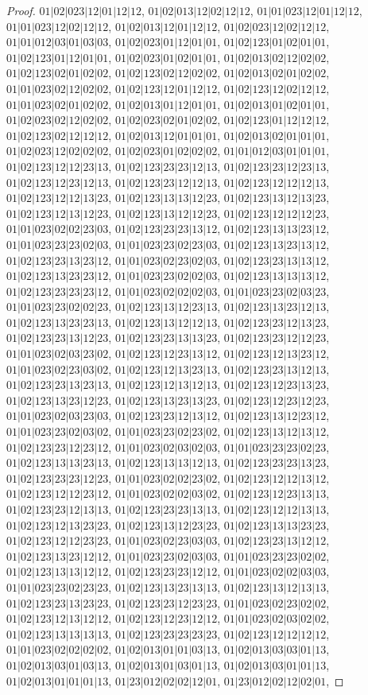\documentclass[12pt]{article}
\theoremstyle{plain}
\theoremstyle{definition}
\theoremstyle{remark}
\begin{document}
\begin{proof}
$01|02|023|12|01|12|12$, $01|02|013|12|02|12|12$, $01|01|023|12|01|12|12$, $01|01|023|12|02|12|12$, $01|02|013|12|01|12|12$, $01|02|023|12|02|12|12$, $01|01|012|03|01|03|03$, $01|02|023|01|12|01|01$, $01|02|123|01|02|01|01$, $01|02|123|01|12|01|01$, $01|02|023|01|02|01|01$, $01|02|013|02|12|02|02$, $01|02|123|02|01|02|02$, $01|02|123|02|12|02|02$, $01|02|013|02|01|02|02$, $01|01|023|02|12|02|02$, $01|02|123|12|01|12|12$, $01|02|123|12|02|12|12$, $01|01|023|02|01|02|02$, $01|02|013|01|12|01|01$, $01|02|013|01|02|01|01$, $01|02|023|02|12|02|02$, $01|02|023|02|01|02|02$, $01|02|123|01|12|12|12$, $01|02|123|02|12|12|12$, $01|02|013|12|01|01|01$, $01|02|013|02|01|01|01$, $01|02|023|12|02|02|02$, $01|02|023|01|02|02|02$, $01|01|012|03|01|01|01$, $01|02|123|12|12|23|13$, $01|02|123|23|23|12|13$, $01|02|123|23|12|23|13$, $01|02|123|12|23|12|13$, $01|02|123|23|12|12|13$, $01|02|123|12|12|12|13$, $01|02|123|12|12|13|23$, $01|02|123|13|13|12|23$, $01|02|123|13|12|13|23$, $01|02|123|12|13|12|23$, $01|02|123|13|12|12|23$, $01|02|123|12|12|12|23$, $01|01|023|02|02|23|03$, $01|02|123|23|23|13|12$, $01|02|123|13|13|23|12$, $01|01|023|23|23|02|03$, $01|01|023|23|02|23|03$, $01|02|123|13|23|13|12$, $01|02|123|23|13|23|12$, $01|01|023|02|23|02|03$, $01|02|123|23|13|13|12$, $01|02|123|13|23|23|12$, $01|01|023|23|02|02|03$, $01|02|123|13|13|13|12$, $01|02|123|23|23|23|12$, $01|01|023|02|02|02|03$, $01|01|023|23|02|03|23$, $01|01|023|23|02|02|23$, $01|02|123|13|12|23|13$, $01|02|123|13|23|12|13$, $01|02|123|13|23|23|13$, $01|02|123|13|12|12|13$, $01|02|123|23|12|13|23$, $01|02|123|23|13|12|23$, $01|02|123|23|13|13|23$, $01|02|123|23|12|12|23$, $01|01|023|02|03|23|02$, $01|02|123|12|23|13|12$, $01|02|123|12|13|23|12$, $01|01|023|02|23|03|02$, $01|02|123|12|13|23|13$, $01|02|123|23|13|12|13$, $01|02|123|23|13|23|13$, $01|02|123|12|13|12|13$, $01|02|123|12|23|13|23$, $01|02|123|13|23|12|23$, $01|02|123|13|23|13|23$, $01|02|123|12|23|12|23$, $01|01|023|02|03|23|03$, $01|02|123|23|12|13|12$, $01|02|123|13|12|23|12$, $01|01|023|23|02|03|02$, $01|01|023|23|02|23|02$, $01|02|123|13|12|13|12$, $01|02|123|23|12|23|12$, $01|01|023|02|03|02|03$, $01|01|023|23|23|02|23$, $01|02|123|13|13|23|13$, $01|02|123|13|13|12|13$, $01|02|123|23|23|13|23$, $01|02|123|23|23|12|23$, $01|01|023|02|02|23|02$, $01|02|123|12|12|13|12$, $01|02|123|12|12|23|12$, $01|01|023|02|02|03|02$, $01|02|123|12|23|13|13$, $01|02|123|23|12|13|13$, $01|02|123|23|23|13|13$, $01|02|123|12|12|13|13$, $01|02|123|12|13|23|23$, $01|02|123|13|12|23|23$, $01|02|123|13|13|23|23$, $01|02|123|12|12|23|23$, $01|01|023|02|23|03|03$, $01|02|123|23|13|12|12$, $01|02|123|13|23|12|12$, $01|01|023|23|02|03|03$, $01|01|023|23|23|02|02$, $01|02|123|13|13|12|12$, $01|02|123|23|23|12|12$, $01|01|023|02|02|03|03$, $01|01|023|23|02|23|23$, $01|02|123|13|23|13|13$, $01|02|123|13|12|13|13$, $01|02|123|23|13|23|23$, $01|02|123|23|12|23|23$, $01|01|023|02|23|02|02$, $01|02|123|12|13|12|12$, $01|02|123|12|23|12|12$, $01|01|023|02|03|02|02$, $01|02|123|13|13|13|13$, $01|02|123|23|23|23|23$, $01|02|123|12|12|12|12$, $01|01|023|02|02|02|02$, $01|02|013|01|01|03|13$, $01|02|013|03|03|01|13$, $01|02|013|03|01|03|13$, $01|02|013|01|03|01|13$, $01|02|013|03|01|01|13$, $01|02|013|01|01|01|13$, $01|23|012|02|02|12|01$, $01|23|012|02|12|02|01$, 
\end{proof}
\end{document}
